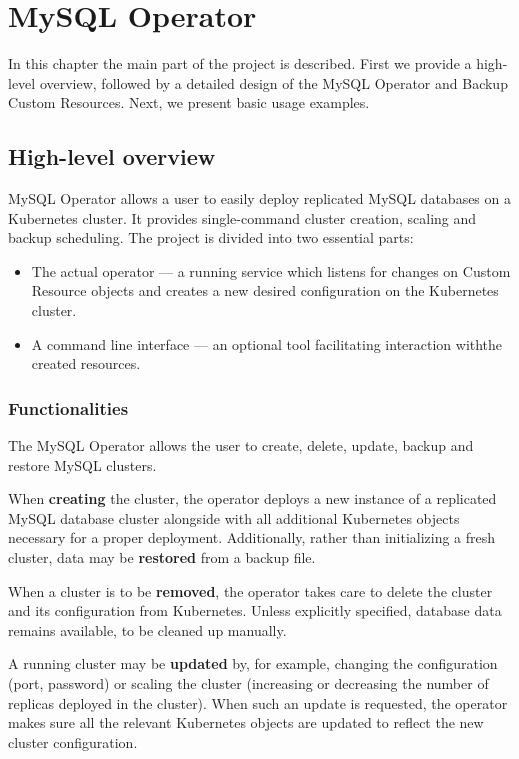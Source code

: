 \chapter{MySQL Operator}

In this chapter the main part of the project is described. First we provide a high-level overview,
followed by a detailed design of the MySQL Operator and Backup Custom Resources. Next, we present
basic usage examples.

\section{High-level overview}
MySQL Operator allows a user to easily deploy replicated MySQL databases on a Kubernetes cluster.
It provides single-command cluster creation, scaling and backup scheduling. The project is divided
into two essential parts:
\begin{itemize}
	\item The actual operator --- a running service which listens for changes on Custom Resource
	objects and creates a new desired configuration on the Kubernetes cluster.
	\item A command line interface --- an optional tool facilitating interaction withthe created
	resources.
\end{itemize}

\subsection{Functionalities}
The MySQL Operator allows the user to create, delete, update, backup and restore MySQL clusters.

When \textbf{creating} the cluster, the operator deploys a new instance of a replicated MySQL
database cluster alongside with all additional Kubernetes objects necessary for a proper deployment.
Additionally, rather than initializing a fresh cluster, data may be
\textbf{restored} from a backup file.

When a cluster is to be \textbf{removed}, the operator takes care to delete the cluster and its
configuration from Kubernetes. Unless explicitly specified, database data remains available, to be
cleaned up manually.

A running cluster may be \textbf{updated} by, for example, changing the configuration (port,
password) or scaling the cluster (increasing or decreasing the number of replicas deployed in the
cluster). When such an update is requested, the operator makes sure all the relevant Kubernetes
objects are updated to reflect the new cluster configuration.

